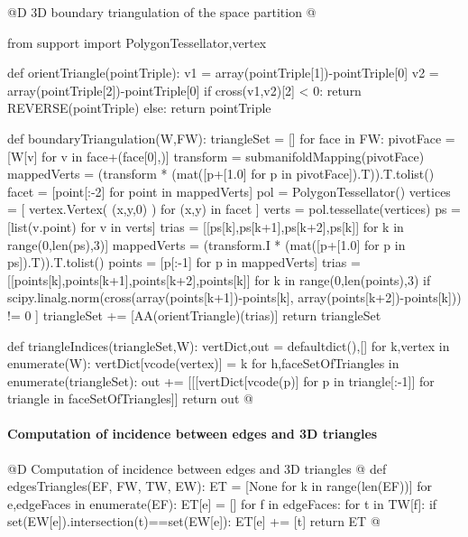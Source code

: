 \documentclass[11pt,oneside]{article}    %
\begin{document}
@D 3D boundary triangulation of the space partition 
@{from support import PolygonTessellator,vertex

def orientTriangle(pointTriple):
    v1 = array(pointTriple[1])-pointTriple[0]
    v2 = array(pointTriple[2])-pointTriple[0]
    if cross(v1,v2)[2] < 0: return REVERSE(pointTriple)
    else: return pointTriple

def boundaryTriangulation(W,FW):
    triangleSet = []
    for face in FW:
        pivotFace = [W[v] for v in face+(face[0],)]
        transform = submanifoldMapping(pivotFace)
        mappedVerts = (transform * (mat([p+[1.0] for p in pivotFace]).T)).T.tolist()
        facet = [point[:-2] for point in mappedVerts]
        pol = PolygonTessellator()
        vertices = [ vertex.Vertex( (x,y,0) ) for (x,y) in facet  ]
        verts = pol.tessellate(vertices)
        ps = [list(v.point) for v in verts]
        trias = [[ps[k],ps[k+1],ps[k+2],ps[k]] for k in range(0,len(ps),3)]
        mappedVerts = (transform.I * (mat([p+[1.0] for p in ps]).T)).T.tolist()
        points = [p[:-1] for p in mappedVerts]
        trias = [[points[k],points[k+1],points[k+2],points[k]] 
            for k in range(0,len(points),3) 
            if scipy.linalg.norm(cross(array(points[k+1])-points[k], 
                                       array(points[k+2])-points[k])) != 0 ]
        triangleSet += [AA(orientTriangle)(trias)]
    return triangleSet


def triangleIndices(triangleSet,W):
    vertDict,out = defaultdict(),[]
    for k,vertex in enumerate(W):  vertDict[vcode(vertex)] = k
    for h,faceSetOfTriangles in enumerate(triangleSet):
        out += [[[vertDict[vcode(p)] for p in triangle[:-1]] 
                    for triangle in faceSetOfTriangles]]
    return out
@}


\paragraph{Computation of incidence between edges and 3D triangles}
@D Computation of incidence between edges and 3D triangles @{
def edgesTriangles(EF, FW, TW, EW):
    ET = [None for k in range(len(EF))]
    for e,edgeFaces in enumerate(EF):
        ET[e] = []
        for f in edgeFaces:
            for t in TW[f]:
                if set(EW[e]).intersection(t)==set(EW[e]):
                    ET[e] += [t]
    return ET
@}
\end{document}

